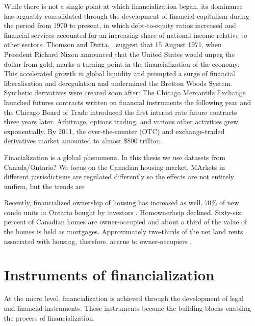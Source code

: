 While there is not a single point at which financialization began, its dominance has arguably consolidated through the development of financial capitalism during the period from 1970 to present, in which debt-to-equity ratios increased and financial services accounted for an increasing share of national income relative to other sectors. Thomson and Dutta, \cite{thomsonFinancialisationPrimer2018}, suggest that 15 August 1971, when President Richard Nixon announced that the United States would unpeg the dollar from gold, marks a turning point in the financialization of the economy. This accelerated growth in global liquidity and prompted a surge of financial liberalisation and deregulation and undermined the Bretton Woods System. Synthetic derivatives were created soon after: The Chicago Mercantile Exchange launched futures contracts written on financial instruments the following year and the Chicago Board of Trade introduced the first interest rate future contracts three years later. Arbitrage, options trading, and various other activities grew exponentially. By 2011, the over-the-counter (OTC) and exchange-traded derivatives market amounted to almost \$800 trillion.

Finacialization is a global phenomena. In this thesis we use datasets from Canada/Ontario? We focus on the Canadian housing market. MArkets in different jusrisdictions are regulated differently so the effects are not entirely unifirm, but the trends are 

Recently, financialized ownership of housing has increased as well.
70\% of new condo units in Ontario bought by investors \cite{}. Homownerhsip declined. Sixty-six percent of Canadian homes are owner-occupied and about a third of the value of the homes is held as mortgages. Approximately two-thirds of the net land rents associated with housing, therefore, accrue to owner-occupiers \cite{nemtinFinancializationHousingSocial2021}. %

\section{Instruments of financialization }
At the  micro level, financialization is achieved through the development of legal and financial instruments. These instruments become the building blocks enabling the process of financialization. 
 
